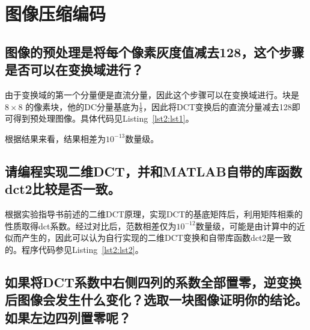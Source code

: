 \documentclass[a4paper]{article}
\begin{document}
	 
	
	 	
	
	
	\section{图像压缩编码}
	\subsection{图像的预处理是将每个像素灰度值减去128，这个步骤是否可以在变换域进行？} 
	由于变换域的第一个分量便是直流分量，因此这个步骤可以在变换域进行。块是$8 \times 8$ 的像素块，他的DC分量基底为$\frac{1}{8}$，因此将DCT变换后的直流分量减去128即可得到预处理图像。具体代码见Listing~\ref{lst2:lst1}。
	
	根据结果来看，结果相差为$10^{-13}$数量级。
	
	

	\subsection{请编程实现二维DCT，并和MATLAB自带的库函数dct2比较是否一致。}
	根据实验指导书前述的二维DCT原理，实现DCT的基底矩阵后，利用矩阵相乘的性质取得dct系数。经过对比后，范数相差仅为$10^{-12}$数量级，可能是由计算中的近似而产生的，因此可以认为自行实现的二维DCT变换和自带库函数dct2是一致的。程序代码参见Listing~\ref{lst2:lst2}。
	
	
		
	
	\subsection{如果将DCT系数中右侧四列的系数全部置零，逆变换后图像会发生什么变化？选取一块图像证明你的结论。如果左边四列置零呢？}
	
\end{document}
